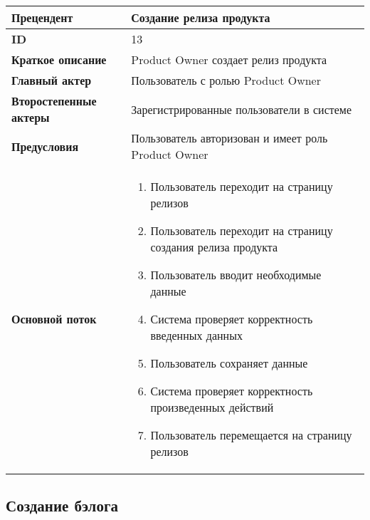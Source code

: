\documentclass[14pt,a4paper]{extarticle}
\begin{document}
\begin{tabular}{|l|p{9cm}|}
	\hline
	\textbf{Прецендент}            & Создание релиза продукта                                         \\
	\hline
	\textbf{ID}                    & 13                                                               \\
	\hline
	\textbf{Краткое описание}      & Product Owner создает релиз продукта                             \\
	\hline
	\textbf{Главный актер}         & Пользователь с ролью Product Owner                               \\
	\hline
	\textbf{Второстепенные актеры} & Зарегистрированные пользователи в системе                        \\
	\hline
	\textbf{Предусловия}           & Пользователь авторизован и имеет роль Product Owner              \\
	\hline
	\textbf{Основной поток}        & \begin{enumerate}
		                                 \item Пользователь переходит на страницу релизов
		                                 \item Пользователь переходит на страницу создания релиза продукта
		                                 \item Пользователь вводит необходимые данные
		                                 \item Система проверяет корректность введенных данных
		                                 \item Пользователь сохраняет данные
		                                 \item Система проверяет корректность произведенных действий
		                                 \item Пользователь перемещается на страницу релизов
	                                 \end{enumerate} \\
	\hline
\end{tabular}

\subsection{Создание бэлога}
\end{document}
